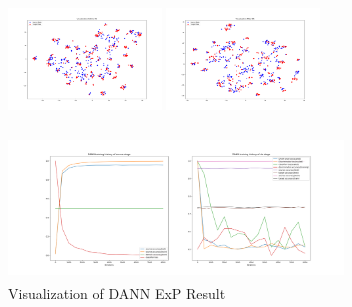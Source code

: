 \documentclass[conference]{IEEEtran}
\begin{document}
\begin{figure}[htb]
\centering
\begin{minipage}[t]{0.26\textwidth}
\includegraphics[width=1.6in, height=1.5in]{Ldann/std_P2R/before.png}
\end{minipage}%
\begin{minipage}[t]{0.26\textwidth}
\includegraphics[width=1.6in, height=1.5in]{Ldann/std_P2R/after.png}
\end{minipage}%
\begin{minipage}[t]{0.45\textwidth}
\includegraphics[width=3.5in, height=1.5in]{Ldann/std_P2R/dann.png}
\end{minipage}%
\caption{Visualization of DANN ExP Result}\label{fig:ExP2}
\end{figure}
\end{document}
